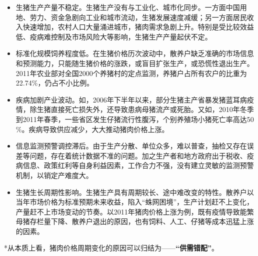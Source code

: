 \documentclass[a4paper,AutoFakeBold,AutoFakeSlant]{ctexart}
\begin{document}
\begin{itemize}
  \item 生猪生产产量不稳定。生猪生产没有与工业化、城市化同步。一方面中国用地、劳力、资金急剧向工业和城市流动，生猪发展速度减缓；另一方面居民收入快速增加，农村人口大量涌进城市，猪肉需求急剧上升。特别是受比较效益低、疫病难控制及市场风险大等影响，生猪生产产量起伏不定。
  \item 标准化规模饲养程度低。在生猪价格历次波动中，散养户缺乏准确的市场信息和预测能力，只能随生猪价格的涨跌，或盲目扩张生产，或恐慌性退出生产。2011年农业部对全国2000个养猪村的定点监测，养猪户占所有农户的比重为22.74$\%$，仍占不小比例。
  \item 疾病加剧产业波动。如，2006年下半年以来，部分生猪主产省暴发猪蓝耳病疫情，除生猪直接死亡损失外，还导致患病母猪流产或死胎。又如，2010年冬季到2011年春季，一些省区发生仔猪流行性腹泻，个别养殖场小猪死亡率高达50$\%$。疾病导致供应减少，大大推动猪肉价格上涨。
  \item 信息监测预警调控滞后。由于生产分散、单位众多，难以普查，抽检又存在误差等问题，存在着统计数据不准的问题。加之生产者和地方政府出于税收、疫病信息、政策红利等自身利益因素，工作合力不强，没有建立灵敏的监测预警机制，以销定产难度大。
  \item 生猪生长周期性影响。生猪生产具有周期较长、途中难改变的特性。散养户以当年市场价格为标准预期未来收益，陷入“蛛网困境”，生产计划赶不上变化，产量赶不上市场变动的节奏。以2011年猪肉价格上涨为例，既有疫情导致能繁母猪存栏量下降、散养户退出的原因，也有饲料、人工、仔猪等成本迅猛上涨的因素。
\end{itemize}


\noindent 
*从本质上看，猪肉价格周期变化的原因可以归结为——\textbf{“供需错配”}。
\end{document}
